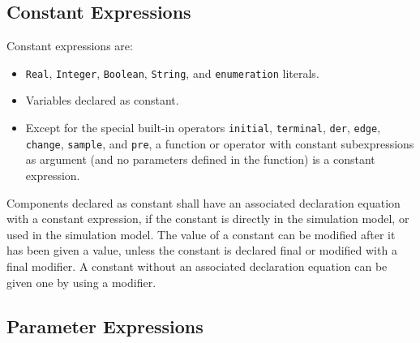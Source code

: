 \subsection{Constant Expressions}

Constant expressions are:
\begin{itemize}
\item
  \lstinline!Real!, \lstinline!Integer!, \lstinline!Boolean!, \lstinline!String!, and \lstinline!enumeration! literals.
\item
  Variables declared as constant.
\item
  Except for the special built-in operators \lstinline!initial!, \lstinline!terminal!, \lstinline!der!,
  \lstinline!edge!, \lstinline!change!, \lstinline!sample!, and \lstinline!pre!, a function or operator with constant
  subexpressions as argument (and no parameters defined in the function)
  is a constant expression.
\end{itemize}

Components declared as constant shall have an associated declaration
equation with a constant expression, if the constant is directly in the
simulation model, or used in the simulation model. The value of a
constant can be modified after it has been given a value, unless the
constant is declared final or modified with a final modifier. A constant
without an associated declaration equation can be given one by using a
modifier.

\subsection{Parameter Expressions}

